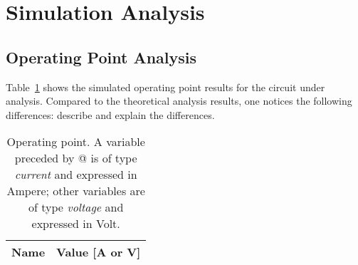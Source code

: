 \section{Simulation Analysis}
\label{sec:simulation}

\subsection{Operating Point Analysis}

Table~\ref{tab:op} shows the simulated operating point results for the circuit
under analysis. Compared to the theoretical analysis results, one notices the
following differences: describe and explain the differences.

\begin{table}[h]
  \centering
  \begin{tabular}{|l|r|}
    \hline    
    {\bf Name} & {\bf Value [A or V]} \\ \hline
    
  \end{tabular}
  \caption{Operating point. A variable preceded by @ is of type {\em current}
    and expressed in Ampere; other variables are of type {\it voltage} and expressed in
    Volt.}
  \label{tab:op}
\end{table}



%
%



%
%
%


